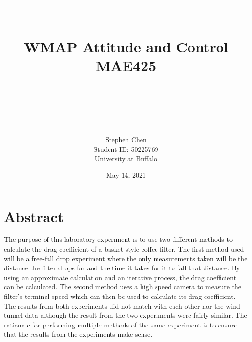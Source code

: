 \documentclass[12pt]{report}
\newcommand{\HRule}[1]{\rule{\linewidth}{#1}}
\begin{document}
\title{ \normalsize \textsc{ }
		\\ [2.0cm]
		\HRule{1pt} \\
		\LARGE \textbf{WMAP Attitude and Control}\\
        \normalsize \textbf{MAE425}\\
		\HRule{1pt} \\ [0.5cm]
		\normalsize  \vspace*{5\baselineskip}}



\author{Stephen Chen \\
		Student ID: 50225769 \\ 
		University at Buffalo \\
    }
        
\date {May 14, 2021}


\maketitle
\tableofcontents
\newpage

\sectionfont{\scshape}


\section*{Abstract}

The purpose of this laboratory experiment is to use two different methods to calculate the drag coefficient of a basket-style coffee filter. The first method used will be a free-fall drop experiment where the only measurements taken will be the distance the filter drops for and the time it takes for it to fall that distance. By using an approximate calculation and an iterative process, the drag coefficient can be calculated. The second method uses a high speed camera to measure the filter's terminal speed which can then be used to calculate its drag coefficient. The results from both experiments did not match with each other nor the wind tunnel data although the result from the two experiments were fairly similar. The rationale for performing multiple methods of the same experiment is to ensure that the results from the experiments make sense.
\end{document}
